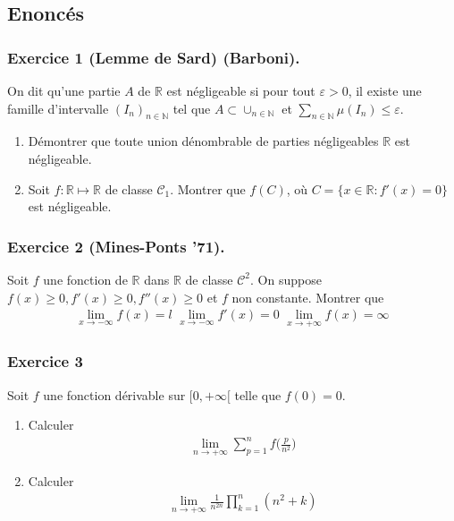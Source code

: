 \documentclass{article}
\begin{document}
\subsection*{Enoncés}
\subsubsection*{Exercice 1 (Lemme de Sard) (Barboni).}
On dit qu'une partie $A$ de $\mathbb{R}$ est négligeable si pour tout $\varepsilon>0$, il existe une famille d'intervalle $(I_n)_{n\in\mathbb{N}}$ tel que $A\subset \cup_{n\in\mathbb{N}}$ et $\sum_{n\in\mathbb{N}}{\mu(I_n)}\leq\varepsilon$.

\begin{enumerate}
\item Démontrer que toute union dénombrable de parties négligeables $\mathbb{R}$ est négligeable.
\item Soit $f : \mathbb{R}\mapsto \mathbb{R}$ de classe $\mathcal{C}_1$. Montrer que $f(C)$, où $C = \{x\in\mathbb{R} : f'(x) = 0\}$ est négligeable.
\end{enumerate}

\subsubsection*{Exercice 2 (Mines-Ponts '71).}
Soit $f$ une fonction de $\mathbb{R}$ dans $\mathbb{R}$ de classe $\mathcal{C}^2$. On suppose $f(x)\geq 0, f'(x)\geq 0, f''(x)\geq 0$ et $f$ non constante. Montrer que
\begin{align*}
\lim_{x\to-\infty}{f(x)}= l \,\, \lim_{x\to-\infty}{f'(x)}= 0\,\, \lim_{x\to+\infty}{f(x)}= \infty
\end{align*}

\subsubsection*{Exercice 3}
Soit $f$ une fonction dérivable sur $[0,+\infty[$ telle que $f(0)=0$. 

\begin{enumerate}
\item Calculer 
\begin{align*}
\lim_{n\to +\infty}\sum_{p=1}^{n}f\bigg(\frac{p}{n^2}\bigg)
\end{align*}
\item Calculer
\begin{align*}
\lim_{n\to +\infty}\frac{1}{n^{2n}}\prod_{k=1}^{n}(n^2+k)
\end{align*}
\end{enumerate}
\end{document}
